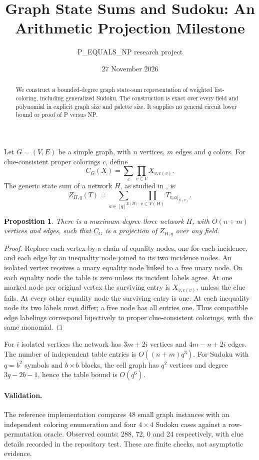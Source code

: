 \documentclass[11pt,a4paper]{article}
\title{Graph State Sums and Sudoku: An Arithmetic Projection Milestone}
\author{P\_EQUALS\_NP research project}
\date{27 November 2026}
\newtheorem{proposition}{Proposition}
\begin{document}
\maketitle
\begin{abstract}
We construct a bounded-degree graph state-sum representation of weighted list-coloring, including generalized Sudoku. The construction is exact over every field and polynomial in explicit graph size and palette size. It supplies no general circuit lower bound or proof of P versus NP.
\end{abstract}
Let \(G=(V,E)\) be a simple graph, with \(n\) vertices, \(m\) edges and \(q\) colors. For clue-consistent proper colorings \(c\), define
\[
 C_G(X)=\sum_c\prod_{v\in V}X_{v,c(v)}.
\]
The generic state sum of a network \(H\), as studied in \cite{openai}, is
\[
 Z_{H,q}(T)=\sum_{a\in[q]^{E(H)}}\prod_{v\in V(H)}T_{v,a|_{E(v)}}.
\]
\begin{proposition}
There is a maximum-degree-three network \(H\), with \(O(n+m)\) vertices and edges, such that \(C_G\) is a projection of \(Z_{H,q}\) over any field.
\end{proposition}
\begin{proof}
Replace each vertex by a chain of equality nodes, one for each incidence, and each edge by an inequality node joined to its two incidence nodes. An isolated vertex receives a unary equality node linked to a free unary node. On each equality node the table is zero unless its incident labels agree. At one marked node per original vertex the surviving entry is \(X_{v,c(v)}\), unless the clue fails. At every other equality node the surviving entry is one. At each inequality node its two labels must differ; a free node has all entries one. Thus compatible edge labelings correspond bijectively to proper clue-consistent colorings, with the same monomial.
\end{proof}
For \(i\) isolated vertices the network has \(3m+2i\) vertices and \(4m-n+2i\) edges. The number of independent table entries is \(O((n+m)q^3)\). For Sudoku with \(q=b^2\) symbols and \(b\times b\) blocks, the cell graph has \(q^2\) vertices and degree \(3q-2b-1\), hence the table bound is \(O(q^6)\).
\paragraph{Validation.} The reference implementation compares 48 small graph instances with an independent coloring enumeration and four \(4\times4\) Sudoku cases against a row-permutation oracle. Observed counts: 288, 72, 0 and 24 respectively, with clue details recorded in the repository test. These are finite checks, not asymptotic evidence.
\end{document}
